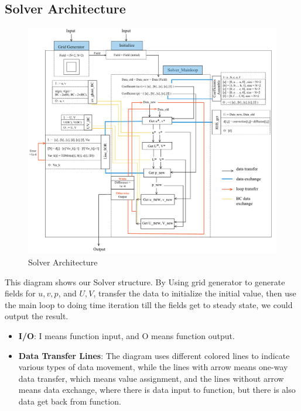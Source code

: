 \documentclass[12pt]{article}
\begin{document}
\subsection{Solver Architecture}
\begin{figure}[H]
    \centering
    \includegraphics[width=1\linewidth]{figures/Solver/Solver_Architecture.jpg}
    \caption{Solver Architecture}
\end{figure}


This diagram shows our Solver structure. By Using grid generator to generate fields for $u, v, p$, and $U, V$, transfer the data to initialize the initial value, then use the main loop to doing time iteration till the fields get to steady state, we could output the result. \\

\begin{itemize}
    \item \textbf{I/O}: I means function input, and O means function output.
    \item \textbf{Data Transfer Lines}: The diagram uses different colored lines to indicate various types of data movement, while the lines with arrow means one-way data transfer, which means value assignment, and the lines without arrow means data exchange, where there is data input to function, but there is also data get back from function.
\end{itemize}
\end{document}
